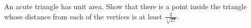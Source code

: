 An acute triangle has unit area. Show that there is a point inside the triangle whose distance from each of the vertices is at least $\frac{2}{\sqrt[4]{27}}$.